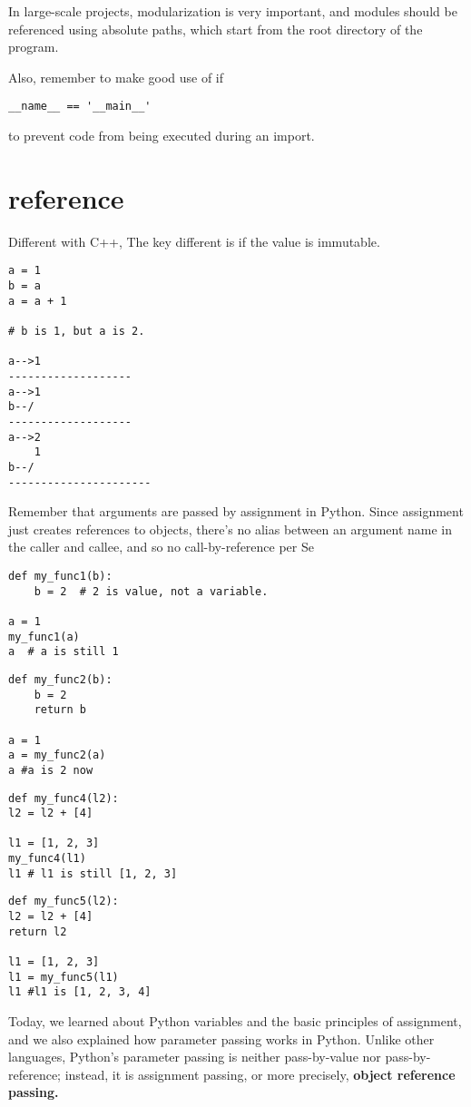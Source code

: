 \documentclass[a4paper,12pt,twoside]{book}
\begin{document}
In large-scale projects, modularization is very important, and modules should be referenced using absolute paths, which start from the root directory of the program.

Also, remember to make good use of if
\begin{lstlisting}
__name__ == '__main__' 
\end{lstlisting}
to prevent code from being executed during an import.

\section{reference}

Different with C++, The key different is if the value is immutable.
\begin{lstlisting}
a = 1
b = a
a = a + 1

# b is 1, but a is 2. 

a-->1
-------------------
a-->1
b--/
-------------------
a-->2
    1
b--/
----------------------
\end{lstlisting}

Remember that arguments are passed by assignment in Python. Since assignment just creates references to objects, there’s no alias between an argument name in the caller and callee, and so no call-by-reference per Se
\begin{lstlisting}
def my_func1(b):
	b = 2  # 2 is value, not a variable.

a = 1
my_func1(a)
a  # a is still 1
\end{lstlisting}

\begin{lstlisting}
def my_func2(b):
	b = 2
	return b

a = 1
a = my_func2(a)
a #a is 2 now
\end{lstlisting}

\begin{lstlisting}
def my_func4(l2):
l2 = l2 + [4]

l1 = [1, 2, 3]
my_func4(l1)
l1 # l1 is still [1, 2, 3]
\end{lstlisting}

\begin{lstlisting}
def my_func5(l2):
l2 = l2 + [4]
return l2

l1 = [1, 2, 3]
l1 = my_func5(l1)
l1 #l1 is [1, 2, 3, 4]
\end{lstlisting}

Today, we learned about Python variables and the basic principles of assignment, and we also explained how parameter passing works in Python. Unlike other languages, Python’s parameter passing is neither pass-by-value nor pass-by-reference; instead, it is assignment passing, or more precisely, \textbf{object reference passing.}
\end{document}
